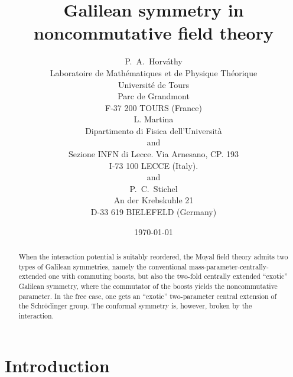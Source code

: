 \documentclass[a4paper,11pt]{article}
\let\ssection=\section
\renewcommand{\section}{\setcounter{equation}{0}\ssection}
\begin{document}
\setlength{\baselineskip}{16pt}

\title{Galilean symmetry in noncommutative field theory}

\author{
P.~A.~Horv\'athy
\\
Laboratoire de Math\'ematiques et de Physique Th\'eorique\\
Universit\'e de Tours\\
Parc de Grandmont\\
F-37 200 TOURS (France)
\\
L. Martina\\
Dipartimento di Fisica dell'Universit\`a
\\
and\\
Sezione INFN di Lecce. Via Arnesano, CP. 193\\
I-73 100 LECCE (Italy).
\\ and\\
P.~C.~Stichel\\
An der Krebskuhle 21\\
D-33 619 BIELEFELD (Germany)
}

\date{\today}

\maketitle

\begin{abstract}
     When the interaction potential is suitably reordered, the
     Moyal field theory admits two types of  Galilean symmetries,
     namely the conventional mass-parameter-centrally-extended
     one with commuting boosts, but also
     the two-fold centrally extended ``exotic'' Galilean symmetry,
     where the commutator of the boosts yields the noncommutative
     parameter.
     In the free case, one gets an ``exotic''
     two-parameter central extension of the Schr\"odinger group.
     The conformal symmetry is, however, broken by the interaction.
\end{abstract}

\section{Introduction}
\end{document}
